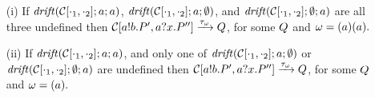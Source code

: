 \begin{lemma}
\label{lemm:error_tau1}
\leavevmode
  \begin{itemize}

  \item[(i)] 
    If $\mathit {drift}(\mathcal{C}[\cdot_1, \cdot_2];a;a)$, $\mathit {drift}(\mathcal{C}[\cdot_1, \cdot_2];a;\emptyset)$,  and $\mathit {drift}(\mathcal{C}[\cdot_1, \cdot_2];\emptyset;a)$  are all three undefined then   %
       $\mathcal{C}[a!b.P',  a?x.P'']\xrightarrow{\tau_\omega}Q$, for some $Q$ and  $\omega = (a) (a).$
  \item[(ii)]  
  If $\mathit {drift}(\mathcal{C}[\cdot_1, \cdot_2];a;a)$, and only one of $\mathit {drift}(\mathcal{C}[\cdot_1, \cdot_2];a;\emptyset)$ or $\mathit {drift}(\mathcal{C}[\cdot_1, \cdot_2];\emptyset;a)$  are undefined then   %
       $\mathcal{C}[a!b.P',  a?x.P'']\xrightarrow{\tau_\omega}Q$, for some $Q$  and  $\omega = (a).$
 \end{itemize}
 \end{lemma}
